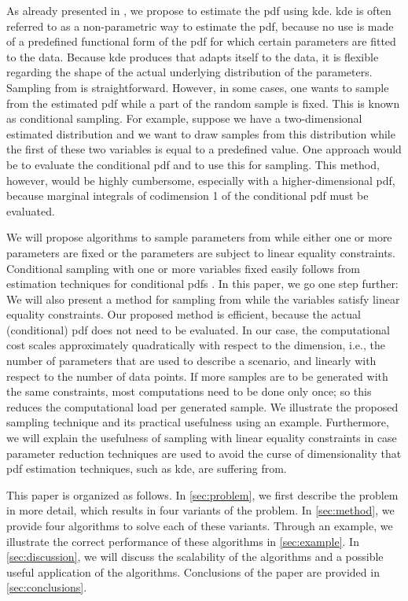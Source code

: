 As already presented in \autocite{deGelder2017assessment}, we propose to estimate the \ac{pdf} using \ac{kde}.
\ac{kde} \autocite{parzen1962estimation, rosenblatt1956remarks} is often referred to as a non-parametric way to estimate the \ac{pdf}, because no use is made of a predefined functional form of the \ac{pdf} for which certain parameters are fitted to the data. 
\cstarta Because \ac{kde} produces  that adapts itself to the data, it is flexible regarding the shape of the actual underlying distribution of the parameters. \cenda
Sampling from  is straightforward.
However, in some cases, one wants to sample from the estimated \ac{pdf} while a part of the random sample is fixed.
This is known as conditional sampling. 
For example, suppose we have a two-dimensional estimated distribution and we want to draw samples from this distribution while the first of these two variables is equal to a predefined value. 
One approach would be to evaluate the conditional \ac{pdf} and to use this for sampling.
This method, however, would be highly cumbersome, especially with a higher-dimensional \ac{pdf}\cstarta, because marginal integrals of codimension 1 of the conditional \ac{pdf} must be evaluated\cenda. 

We will propose algorithms to sample parameters from  while either one or more parameters are fixed or the parameters are subject to linear equality constraints.
Conditional sampling with one or more variables fixed easily follows from estimation techniques for conditional \acp{pdf} \autocite{hyndman1996estimating, holmes2007fast}.
In this paper, we go one step further: We will also present a method for sampling from  while the variables satisfy linear equality constraints. 
\cstarta Our proposed method is efficient, because the actual (conditional) \ac{pdf} does not need to be evaluated. \cenda
In our case, the computational cost scales approximately quadratically with respect to the dimension, i.e., the number of parameters that are used to describe a scenario, and linearly with respect to the number of data points. 
If more samples are to be generated with the same constraints, most computations need to be done only once; so this reduces the computational load per generated sample.
We illustrate the proposed sampling technique and its practical usefulness using an example.
Furthermore, we will explain the usefulness of sampling with linear equality constraints in case parameter reduction techniques are used to avoid the curse of dimensionality that \ac{pdf} estimation techniques, such as \ac{kde}, are suffering from.

This paper is organized as follows.
In \cref{sec:problem}, we first describe the problem in more detail, which results in four variants of the problem.
In \cref{sec:method}, we provide four algorithms to solve each of these variants.
Through an example, we illustrate the correct performance of these algorithms in \cref{sec:example}.
In \cref{sec:discussion}, we will discuss the scalability of the algorithms and a possible useful application of the algorithms. 
Conclusions of the paper are provided in \cref{sec:conclusions}.
